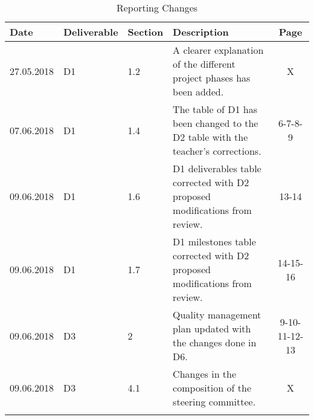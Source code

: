 \begin{longtable}[H]{l l l p{7cm} c}
	
	\toprule[2pt]
	
	\textbf{Date} & \textbf{Deliverable} & \textbf{Section} &  \textbf{Description} & \textbf{Page} \\
	
	\midrule[1.5pt] 
	\endhead
	
	27.05.2018 & D1 & 1.2  & A clearer explanation of the different project phases has been added. & X \vspace{0.2cm} \\
	
	\midrule

	07.06.2018 & D1 & 1.4  & The table of D1 has been changed to the D2 table with the teacher's corrections. & 6-7-8-9 \vspace{0.2cm} \\
	
	\midrule

	09.06.2018 & D1 & 1.6  & D1 deliverables table corrected with D2 proposed modifications from review. & 13-14 \vspace{0.2cm} \\
	
	\midrule

	09.06.2018 & D1 & 1.7  & D1 milestones table corrected with D2 proposed modifications from review. & 14-15-16 \vspace{0.2cm} \\
	
	\midrule
		
	09.06.2018 & D3 & 2  & Quality management plan updated with the changes done in D6. & 9-10-11-12-13 \vspace{0.2cm} \\
	
	\midrule
	
	09.06.2018 & D3 & 4.1  & Changes in the composition of the steering committee. & X \vspace{0.2cm} \\
	
	\bottomrule[2pt]
	
	\caption{Reporting Changes}
\end{longtable}

